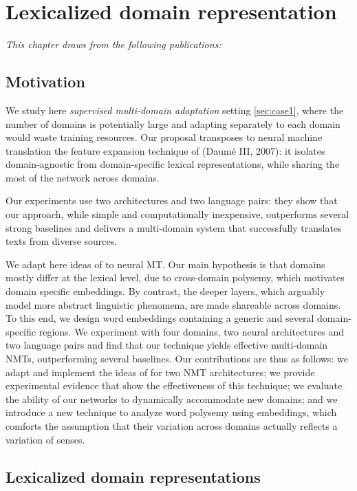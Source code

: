 \chapter{Lexicalized domain representation}
\textit{This chapter draws from the following publications: \citet{Pham19generic}}
\section{Motivation}
  We study here \emph{supervised multi-domain adaptation} setting \ref{sec:case1}, where the number of domains is potentially large and adapting separately to each domain would waste training resources. Our proposal transposes to neural machine translation the feature expansion technique of (Daum\'e III, 2007): it isolates domain-agnostic from domain-specific lexical representations, while sharing the most of the network across domains.
  
Our experiments use two architectures and two language pairs: they show that our approach, while simple and computationally inexpensive, outperforms several strong baselines and delivers a multi-domain system that successfully translates texts from diverse sources.

We adapt here ideas of \cite{Daume07frustratingly} to neural MT. Our main hypothesis is that domains mostly differ at the lexical level, due to cross-domain polysemy, which motivates domain specific embeddings. By contrast, the deeper layers, which arguably model more abstract linguistic phenomena, are made shareable across domains. To this end, we design word embeddings containing a generic and several domain-specific regions. We experiment with four domains, two neural architectures and two language pairs and find that our technique yields effective multi-domain NMTs, outperforming several baselines. Our contributions are thus as follows: we adapt and implement the ideas of \cite{Daume07frustratingly} for two NMT architectures; we provide experimental evidence that show the effectiveness of this technique; we evaluate the ability of our networks to dynamically accommodate new domains; and we introduce a new technique to analyze word polysemy using embeddings, which comforts the assumption that their variation across domains actually reflects a variation of senses.

\section{Lexicalized domain representations\label{sec:lexicalized_embeddings}}
